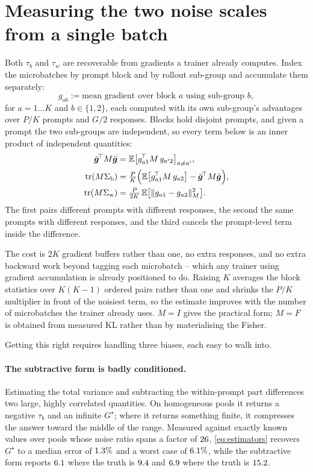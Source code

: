 \section{Measuring the two noise scales from a single batch}
\label{sec:estimation}

Both $\tau_b$ and $\tau_w$ are recoverable from gradients a trainer already computes. Index the
microbatches by prompt block and by rollout sub-group and accumulate them separately:
\begin{equation}
  \label{eq:cells}
  g_{ab} := \text{mean gradient over block } a \text{ using sub-group } b,
\end{equation}
for $a = 1 \dots K$ and $b \in \{1,2\}$, each computed with its own sub-group's advantages over
$P/K$ prompts and $G/2$ responses.
Blocks hold disjoint prompts, and given a prompt the two sub-groups are independent, so every term
below is an inner product of independent quantities:
\begin{align}
  \label{eq:estimators}
  \bar{\bm{g}}^{\!\top} M \bar{\bm{g}} &= \mathbb{E}\big[ g_{a1}^{\!\top} M\, g_{a'2} \big]_{a \neq a'}, \\
  \operatorname{tr}(M\Sigma_{\mathrm{b}}) &= \tfrac{P}{K}\Big( \mathbb{E}\big[ g_{a1}^{\!\top} M\, g_{a2} \big]
     - \bar{\bm{g}}^{\!\top} M \bar{\bm{g}} \Big), \notag \\
  \operatorname{tr}(M\Sigma_{\mathrm{w}}) &= \tfrac{P}{2K}\, \mathbb{E}\big[ \| g_{a1} - g_{a2} \|_M^2 \big]. \notag
\end{align}
The first pairs different prompts with different responses, the second the same prompts with
different responses, and the third cancels the prompt-level term inside the difference.

The cost is $2K$ gradient buffers rather than one, no extra responses, and no extra backward work
beyond tagging each microbatch -- which any trainer using gradient accumulation is already
positioned to do. Raising $K$ averages the block statistics over $K(K-1)$ ordered pairs rather than
one and shrinks the $P/K$ multiplier in front of the noisiest term, so the estimate improves with
the number of microbatches the trainer already uses. $M = I$ gives the practical form; $M = F$ is
obtained from measured KL rather than by materialising the Fisher.

Getting this right requires handling three biases, each easy to walk into.

\paragraph{The subtractive form is badly conditioned.} Estimating the total variance and
subtracting the within-prompt part differences two large, highly correlated quantities. On
homogeneous pools it returns a negative $\tau_b$ and an infinite $G^{\star}$; where it returns something
finite, it compresses the answer toward the middle of the range. Measured against exactly known
values over pools whose noise ratio spans a factor of $26$, \eqref{eq:estimators} recovers $G^{\star}$
to a median error of $1.3\%$ and a worst case of $6.1\%$, while the subtractive
form reports $6.1$ where the truth is $9.4$ and $6.9$ where the
truth is $15.2$.

